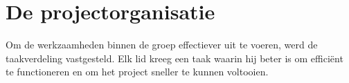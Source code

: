\section{De projectorganisatie}
Om de werkzaamheden binnen de groep effectiever uit te voeren, werd de taakverdeling vastgesteld. Elk lid kreeg een taak waarin hij beter is om efficiënt te functioneren en om het project sneller te kunnen voltooien.



